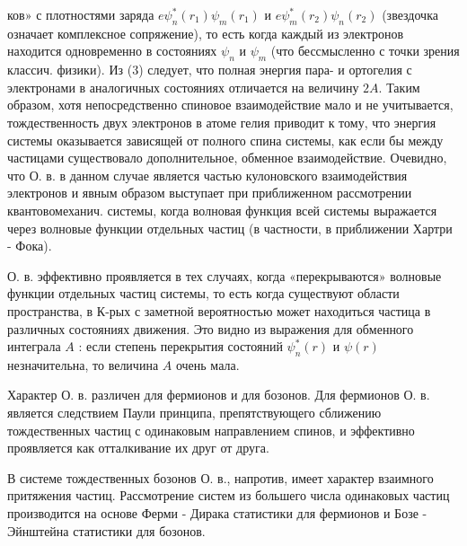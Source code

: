 \documentclass[10pt]{article}
\begin{document}
ков» с плотностями заряда $e \psi_{n}^{*}\left(r_{1}\right) \psi_{m}\left(r_{1}\right)$ и $e \psi_{m}^{*}\left(r_{2}\right) \psi_{n}\left(r_{2}\right)$ (звездочка означает комплексное сопряжение), то есть когда каждый из электронов находится одновременно в состояниях $\psi_{n}$ и $\psi_{m}$ (что бессмысленно с точки зрения классич. физики). Из (3) следует, что полная энергия пара- и ортогелия с электронами в аналогичных состояниях отличается на величину $2 A$. Таким образом, хотя непосредственно спиновое взаимодействие мало и не учитывается, тождественность двух электронов в атоме гелия приводит к тому, что энергия системы оказывается зависящей от полного спина системы, как если бы между частицами существовало дополнительное, обменное взаимодействие. Очевидно, что О. в. в данном случае является частью кулоновского взаимодействия электронов и явным образом выступает при приближенном рассмотрении квантовомеханич. системы, когда волновая функция всей системы выражается через волновые функции отдельных частиц (в частности, в приближении Хартри - Фока).



О. в. эффективно проявляется в тех случаях, когда «перекрываются» волновые функции отдельных частиц системы, то есть когда существуют области пространства, в К-рых с заметной вероятностью может находиться частица в различных состояниях движения. Это видно из выражения для обменного интеграла $A$ : если степень перекрытия состояний $\psi_{n}^{*}(r)$ и $\psi(r)$ незначительна, то величина $A$ очень мала.



Характер О. в. различен для фермионов и для бозонов. Для фермионов О. в. является следствием Паули принципа, препятствующего сближению тождественных частиц с одинаковым направлением спинов, и эффективно проявляется как отталкивание их друг от друга.



В системе тождественных бозонов О. в., напротив, имеет характер взаимного притяжения частиц. Рассмотрение систем из большего числа одинаковых частиц производится на основе Ферми - Дирака статистики для фермионов и Бозе - Эйнштейна статистики для бозонов.
\end{document}
